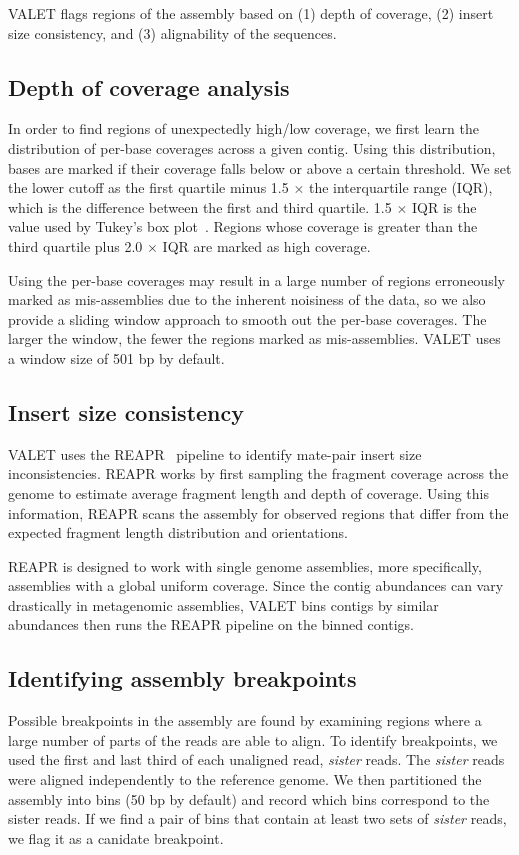 \documentclass{bioinfo}
\begin{document}
VALET flags regions of the assembly based on (1) depth of coverage, (2) insert size consistency, and (3) alignability of the sequences.

\subsection{Depth of coverage analysis}
In order to find regions of unexpectedly high/low coverage, we first learn the distribution of per-base coverages across a given contig.  Using this distribution, bases are marked if their coverage falls below or above a certain threshold.  We set the lower cutoff as the first quartile minus 1.5 $\times$ the interquartile range (IQR), which is the difference between the first and third quartile. 1.5 $\times$ IQR is the value used by Tukey’s box plot~\citep{mcgill1978variations}.  Regions whose coverage is greater than the third quartile plus 2.0 $\times$ IQR are marked as high coverage.


Using the per-base coverages may result in a large number of regions erroneously marked as mis-assemblies due to the inherent noisiness of the data, so we also provide a sliding window approach to smooth out the per-base coverages. The larger the window, the fewer the regions marked as mis-assemblies.
VALET uses a window size of 501 bp by default.

\subsection{Insert size consistency}
VALET uses the REAPR~\citep{hunt2013reapr} pipeline to identify mate-pair insert size inconsistencies.  REAPR works by first sampling the fragment coverage across the genome to estimate average fragment length and depth of coverage.  Using this information, REAPR scans the assembly for observed regions that differ from the expected fragment length distribution and orientations.

REAPR is designed to work with single genome assemblies, more specifically, assemblies with a global uniform coverage.  Since the contig abundances can vary drastically in metagenomic assemblies, VALET bins contigs by similar abundances then runs the REAPR pipeline on the binned contigs.

\subsection{Identifying assembly breakpoints}
Possible breakpoints in the assembly are found by examining regions where a large number of parts of the reads are able to align.
To identify breakpoints, we used the first and last third of each unaligned read, \emph{sister} reads.
The \emph{sister} reads were aligned independently to the reference genome.
We then partitioned the assembly into bins (50 bp by default) and record which bins correspond to the sister reads.
If we find a pair of bins that contain at least two sets of \textit{sister} reads, we flag it as a canidate breakpoint.
\end{document}
